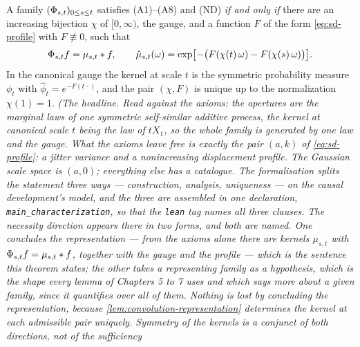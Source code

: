 \begin{theorem}\label{thm:main-characterization}
\leanok
{}
A family $(\Phi_{s,t})_{0 \le s \le t}$ satisfies (A1)--(A8) and (ND) \emph{if and only if}
there are an increasing bijection $\chi$ of $[0,\infty)$, the gauge, and a function $F$ of the
form \ref{eq:sd-profile} with $F \not\equiv 0$, such that
\[
  \Phi_{s,t} f = \mu_{s,t} * f, \qquad
  \hat\mu_{s,t}(\omega) = \exp\bigl[-\bigl(F(\chi(t)\,\omega) - F(\chi(s)\,\omega)\bigr)\bigr].
\]
In the canonical gauge the kernel at scale $t$ is the symmetric probability measure $\phi_t$
with $\hat\phi_t = e^{-F(t\,\cdot)}$, and the pair $(\chi,F)$ is unique up to the normalization
$\chi(1) = 1$.
\statusT\quad\emph{(The headline. Read against the axioms: the apertures are the marginal laws
of one symmetric self-similar additive process, the kernel at canonical scale $t$ being the law
of $tX_1$, so the whole family is generated by one law and the gauge. What the axioms leave
free is exactly the pair $(a,k)$ of \ref{eq:sd-profile}: a jitter variance and a nonincreasing
displacement profile. The Gaussian scale space is $(a,0)$; everything else has a catalogue. The
formalisation splits the statement three ways --- construction, analysis, uniqueness --- on the
causal development's model, and the three are assembled in one declaration,
\texttt{main\_characterization}, so that the \texttt{lean} tag names all three clauses. The
necessity direction appears there in two forms, and both are named. One concludes the
representation --- from the axioms alone there \emph{are} kernels $\mu_{s,t}$ with
$\Phi_{s,t}f = \mu_{s,t} * f$, together with the gauge and the profile --- which is the
sentence this theorem states; the other takes a representing family as a hypothesis, which is
the shape every lemma of Chapters 5 to 7 uses and which says more about a \emph{given} family,
since it quantifies over all of them. Nothing is lost by concluding the representation, because
\ref{lem:convolution-representation} determines the kernel at each admissible pair uniquely.
Symmetry of the kernels is a conjunct of \emph{both} directions, not of the sufficiency
}
\end{theorem}
